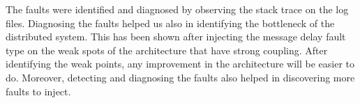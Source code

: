 The faults were identified and diagnosed by observing the stack trace on the log files. Diagnosing the faults helped us also in identifying the bottleneck of the distributed system. This has been shown after injecting the message delay fault type on the weak spots of the architecture that have strong coupling. After identifying the weak points, any improvement in the architecture will be easier to do. Moreover, detecting and diagnosing the faults also helped in discovering more faults to inject. 



